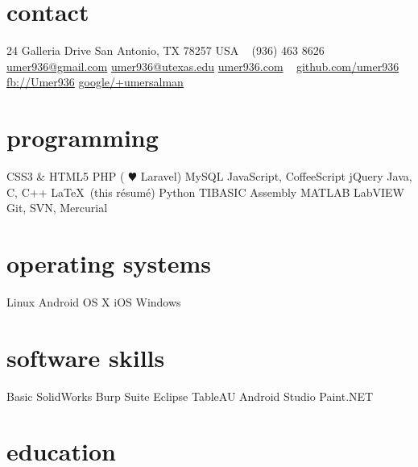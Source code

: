 \documentclass[]{friggeri-cv} %
\begin{document}


\begin{aside} %
	\section{contact}
	24 Galleria Drive
	San Antonio, TX 78257
	USA
	~
	(936) 463 8626
	~
	\href{mailto:umer936@gmail.com}{umer936@gmail.com}
	\href{mailto:umer936@utexas.edu}{umer936@utexas.edu}
	\href{http://umer936.com}{umer936.com}
	~
	\href{http://github.com/umer936}{github.com/umer936}
	\href{http://facebook.com/Umer936}{fb://Umer936}
	\href{http://google.com/+umersalman}{google/+umersalman}
	~
	\section{programming}
	CSS3 \& HTML5
	PHP ({\color{red} $\varheartsuit$} Laravel)
	MySQL
	JavaScript, CoffeeScript
	jQuery
	Java, C, C++
	\LaTeX \ (this r\'esum\'e)
	Python
	TIBASIC
	Assembly
	MATLAB
	LabVIEW
	Git, SVN, Mercurial
	~
	\section{operating systems}
	Linux
	Android
	OS X
	iOS
	Windows
	~
	\section{software skills}
	Basic SolidWorks
	Burp Suite
	Eclipse
	TableAU
	Android Studio
	Paint.NET
\end{aside}


\section{education}
\end{document}
